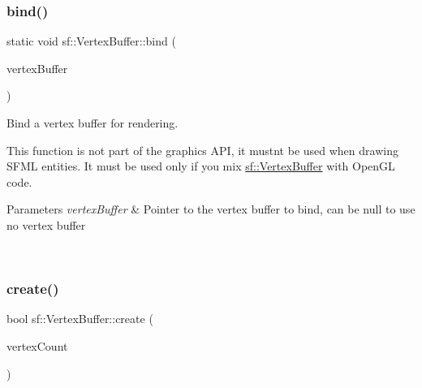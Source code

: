 \subsubsection{\texorpdfstring{bind()}{bind()}}
{\footnotesize\ttfamily static void sf\+::\+Vertex\+Buffer\+::bind (\begin{DoxyParamCaption}\item[{const \mbox{\hyperlink{classsf_1_1_vertex_buffer}{Vertex\+Buffer}} $\ast$}]{vertex\+Buffer }\end{DoxyParamCaption})\hspace{0.3cm}{\ttfamily [static]}}



Bind a vertex buffer for rendering. 

This function is not part of the graphics A\+PI, it mustn\textquotesingle{}t be used when drawing S\+F\+ML entities. It must be used only if you mix \mbox{\hyperlink{classsf_1_1_vertex_buffer}{sf\+::\+Vertex\+Buffer}} with Open\+GL code.


\begin{DoxyCode}{0}
\DoxyCodeLine{\textcolor{comment}{// draw OpenGL stuff that use vb1...}}
\DoxyCodeLine{\textcolor{comment}{// draw OpenGL stuff that use vb2...}}
\DoxyCodeLine{\textcolor{comment}{// draw OpenGL stuff that use no vertex buffer...}}
\end{DoxyCode}



\begin{DoxyParams}{Parameters}
{\em vertex\+Buffer} & Pointer to the vertex buffer to bind, can be null to use no vertex buffer \begin{DoxyVerb}\end{DoxyVerb}
 \\
\hline
\end{DoxyParams}
\mbox{\label{classsf_1_1_vertex_buffer_aa68e128d59c7f7d5eb0d4d94125439a5}} 
\subsubsection{\texorpdfstring{create()}{create()}}
{\footnotesize\ttfamily bool sf\+::\+Vertex\+Buffer\+::create (\begin{DoxyParamCaption}\item[{std\+::size\+\_\+t}]{vertex\+Count }\end{DoxyParamCaption})}



